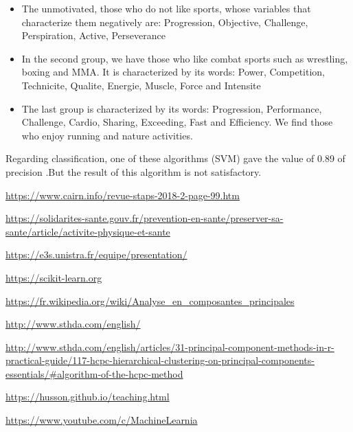 \documentclass[12pt]{article}
\begin{document}
\begin{itemize}

\item The unmotivated, those who do not like sports, whose variables that characterize them negatively are:  Progression, Objective, Challenge, Perspiration, Active, Perseverance

\item In the second group, we have those who like combat sports such as wrestling, boxing and MMA. It is characterized by its words: Power, Competition, Technicite, Qualite, Energie, Muscle, Force and Intensite 

\item  The last group is characterized by its words: Progression, Performance, 
Challenge, Cardio, Sharing, Exceeding, Fast and Efficiency. 
We find those who enjoy running and nature activities. 

\end{itemize}

\noindent Regarding classification, one of these algorithms (SVM) gave the value of 0.89 of precision .But the result of this algorithm is not satisfactory.  


\begin{thebibliography}{9}

\url{https://www.cairn.info/revue-staps-2018-2-page-99.htm}


\url{https://solidarites-sante.gouv.fr/prevention-en-sante/preserver-sa-sante/article/activite-physique-et-sante}

\url{https://e3s.unistra.fr/equipe/presentation/}

\url{https://scikit-learn.org}

\bibitem{}
\url{https://fr.wikipedia.org/wiki/Analyse_en_composantes_principales}


\url{http://www.sthda.com/english/}

\url{http://www.sthda.com/english/articles/31-principal-component-methods-in-r-practical-guide/117-hcpc-hierarchical-clustering-on-principal-components-essentials/#algorithm-of-the-hcpc-method}


\url{https://husson.github.io/teaching.html}


\url{https://www.youtube.com/c/MachineLearnia}



\end{thebibliography}
\end{document}
